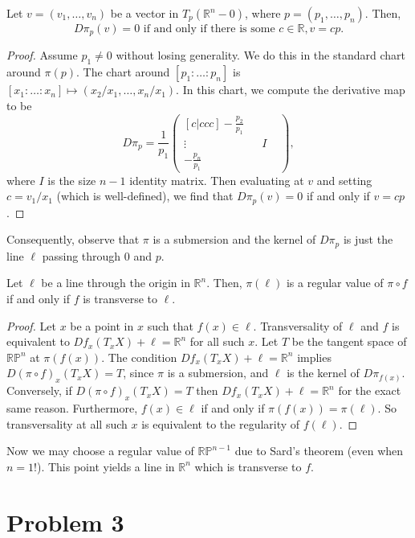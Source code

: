 \documentclass{amsbook}
\theoremstyle{theorem}
\theoremstyle{plain}
\theoremstyle{remark}
\newcommand{\R}{\mathbb R}
\renewcommand{\P}{\mathbb P}
\begin{document}
\begin{lemma}
  Let $v = (v_1,\dots, v_n)$ be a vector in $T_p(\R^n - 0)$, where $p = (p_1, \dots, p_n)$. Then, \[D\pi_p(v) = 0 \text{ if and only if there is some } c \in \R, v = cp.\]
\end{lemma}
\begin{proof}
  Assume $p_1 \neq 0$ without losing generality. We do this in the standard chart around $\pi(p)$. The chart around $[p_1:\dots:p_n]$ is $[x_1:\dots:x_n] \mapsto (x_2/x_1, \dots, x_n/x_1)$. In this chart, we compute the derivative map to be \[D\pi_p =
    \frac{1}{p_1}\begin{pmatrix}[c|ccc]
                   -\tfrac{p_2}{p_1} & &&\\
                   \vdots &  & I &\\
                   -\tfrac{p_n}{p_1}&&&
    \end{pmatrix},\] where $I$ is the size $n-1$ identity matrix. Then evaluating at $v$ and setting $c = v_1/x_1$ (which is well-defined), we find that $D\pi_p(v) = 0$ if and only if $v = cp$.
\end{proof}
Consequently, observe that $\pi$ is a submersion and the kernel of $D\pi_p$ is just the line $\ell$ passing through $0$ and $p$. 
\begin{lemma}
  Let $\ell$ be a line through the origin in $\R^n$. Then, $\pi(\ell)$ is a regular value of $\pi\circ f$ if and only if $f$ is transverse to $\ell$. 
\end{lemma}
\begin{proof}
  Let $x$ be a point in $x$ such that $f(x) \in \ell$. Transversality of $\ell$ and $f$ is equivalent to $Df_x(T_xX) + \ell = \R^n$ for all such $x$. Let $T$ be the tangent space of $\R\P^n$ at $\pi(f(x))$. The condition $Df_x(T_xX) + \ell = \R^n$ implies $D(\pi\circ f)_x(T_xX) = T$, since $\pi$ is a submersion, and $\ell$ is the kernel of $D\pi_{f(x)}$. Conversely, if $D(\pi\circ f)_x(T_xX) = T$ then $Df_x(T_xX) + \ell = \R^n$ for the exact same reason. Furthermore, $f(x) \in \ell$ if and only if $\pi(f(x)) = \pi(\ell)$. So transversality at all such $x$ is equivalent to the regularity of $f(\ell)$. 
\end{proof}

Now we may choose a regular value of $\R\P^{n-1}$ due to Sard's theorem (even when $n = 1$!). This point yields a line in $\R^n$ which is transverse to $f$.

\chapter*{Problem 3}
\end{document}
